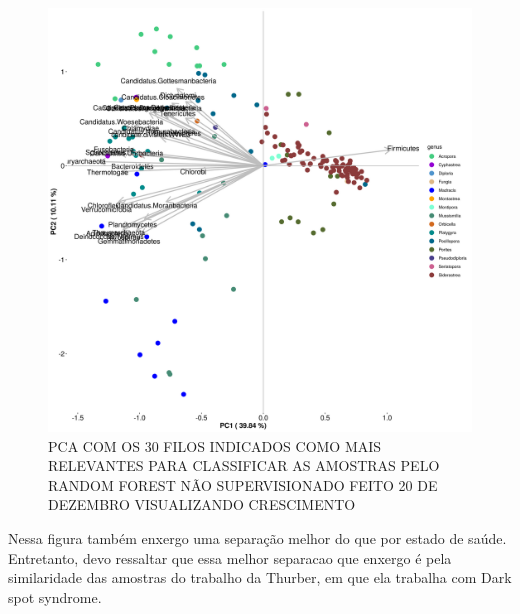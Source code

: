 \documentclass[12pt, a4paper]{report}
\begin{document}
\begin{figure}[H]
	\centering
	\includegraphics[scale=0.4]{figures/PCA_rf_nao_super_30_157_corais_genus_2018_12_20.png}
	\caption{PCA COM OS 30 FILOS INDICADOS COMO MAIS RELEVANTES PARA CLASSIFICAR AS AMOSTRAS PELO RANDOM FOREST NÃO SUPERVISIONADO FEITO 20 DE DEZEMBRO VISUALIZANDO CRESCIMENTO}
	\label{fig: PCACOMOS30FILOSINDICADOSCOMOMAISRELEVANTESPARACLASSIFICARASAMOSTRASPELORANDOMFORESTNÃOSUPERVISIONADOFEITO20DEDEZEMBROVISUALIZANDOCRESCIMENTO}
\end{figure}
Nessa figura também enxergo uma separação melhor do que por estado de saúde. Entretanto, devo ressaltar que essa melhor separacao que enxergo é pela similaridade das amostras do trabalho da Thurber, em que ela trabalha com Dark spot syndrome.
\end{document}
